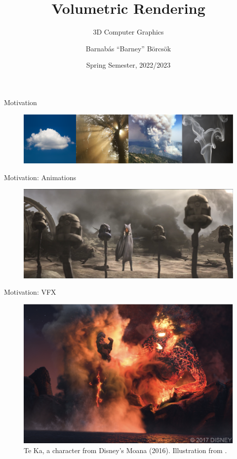 \documentclass[
  english,            %
  aspectratio=169,    %
]{tumbeamer}
\title{Volumetric Rendering}
\subtitle{3D Computer Graphics}
\author{Barnabás ``Barney'' Börcsök}
\institute{\theChairName\\\theDepartmentName\\\theUniversityName}
\date[Spring 2023]{Spring Semester, 2022/2023}
\begin{document}
\maketitle

\begin{frame}{Motivation}
  \begin{figure}
      \centering
      \includegraphics{img/teaser.png}
      \label{fig:teaser}
  \end{figure}
\end{frame}


\begin{frame}{Motivation: Animations}
  \begin{figure}
      \centering
      \includegraphics[width=\textwidth]{img/ahsoka-smoke.png}
  \end{figure}
\end{frame}

\begin{frame}{Motivation: VFX}
  \begin{figure}
      \centering
      \includegraphics[width=0.6\columnwidth]{img/moana-motivation.png}
      \caption*{
        Te Ka, a character from Disney’s Moana (2016).
        Illustration from \cite{ProductionVolumeRenderingSIGGRAPH}.
      }
  \end{figure}
\end{frame}
\end{document}

